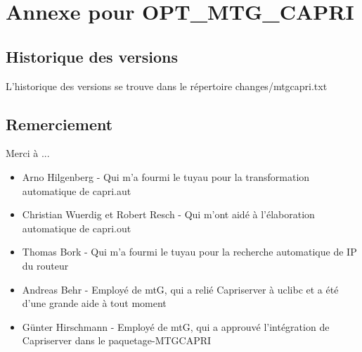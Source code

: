 \section {Annexe pour OPT\_MTG\_CAPRI}
\subsection{Historique des versions}
    L'historique des versions se trouve dans le répertoire changes/mtgcapri.txt
\subsection{Remerciement}
    Merci à ...
    \begin{itemize}
        \item Arno Hilgenberg - Qui m'a fourmi le tuyau pour la transformation automatique de capri.aut
        \item Christian Wuerdig et Robert Resch - Qui m'ont aidé à l'élaboration automatique de capri.out
        \item Thomas Bork - Qui m'a fourmi le tuyau pour la recherche automatique de IP du routeur
        \item Andreas Behr - Employé de mtG, qui a relié Capriserver à uclibc et a été d'une grande aide à tout moment
        \item Günter Hirschmann - Employé de mtG, qui a approuvé l'intégration de Capriserver dans le paquetage-MTGCAPRI
    \end{itemize}

